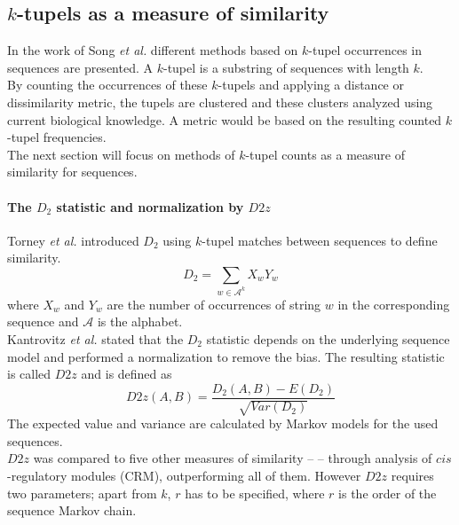 \documentclass[twocolumn]{bmcart}%
\begin{document}
\subsection*{$k$-tupels as a measure of similarity}
In the work of Song \textit{et al.}\cite{doi:10.1093/bib/bbt067} different methods based on $k$-tupel occurrences in sequences are presented. A $k$-tupel is a substring of sequences with length $k$.\\
By counting the occurrences of these $k$-tupels and applying a distance or dissimilarity metric, the tupels are clustered and these clusters analyzed using current biological knowledge. A metric would be based on the resulting counted $k$-tupel frequencies.\\
The next section will focus on methods of $k$-tupel counts as a measure of similarity for sequences.
\paragraph*{The $D_2$ statistic and normalization by $D2z$}
Torney \textit{et al.}\cite{torney1990computation} introduced $D_2$  using $k$-tupel matches between sequences to define similarity.
$$D_2=\sum_{w\in \mathcal{A}^k}X_wY_w$$
where $X_w$ and $Y_w$ are the number of occurrences of string $w$ in the corresponding sequence and $ \mathcal{A}$ is the alphabet.\\
Kantrovitz \textit{et al.}\cite{kantorovitz2007statistical} stated that the $D_2$ statistic depends on the  underlying sequence model and performed a normalization to remove the bias. The resulting statistic is called $D2z$ and is defined as
$$D2z(A,B)=\frac{D_2(A,B)-E(D_2)}{\sqrt{Var(D_2)}}$$
The expected value and variance are calculated by Markov models for the used sequences.\\
$D2z$ was compared to five other measures of similarity -- \cite{doi:10.1093/bib/bbt067,kantorovitz2007statistical} -- through analysis of $cis$-regulatory modules (CRM), outperforming all of them. However $D2z$ requires two parameters; apart from $k$, $r$ has to be specified, where $r$ is the order of the sequence Markov chain.
\end{document}
